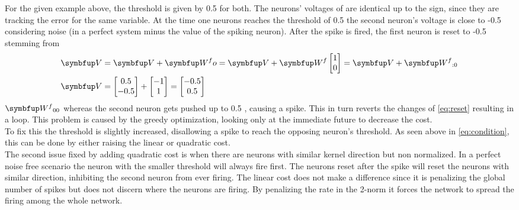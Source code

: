 For the given example above, the threshold is given by 0.5 for both. The neurons' voltages of are identical up to the sign, since they are tracking the error for the same variable. At the time one neurons reaches the threshold of 0.5 the second neuron's voltage is close to -0.5 considering noise (in a perfect system minus the value of the spiking neuron). After the spike is fired, the first neuron is reset to -0.5 stemming from
\begin{equation}\label{eq:reset}
\begin{aligned}
\bmu{V} &= \bmu{V} + \bmu{W^fo} = \bmu{V} + \bmu{W^f}\begin{bmatrix}
1\\
0
\end{bmatrix} = \bmu{V} + \bmu{W^f}_{:0}\\
\bmu{V} &= \begin{bmatrix}
0.5\\
-0.5\\
\end{bmatrix} +
\begin{bmatrix}
-1\\
1\\
\end{bmatrix} =
\begin{bmatrix}
-0.5\\
0.5
\end{bmatrix}
\end{aligned}
\end{equation}
$\bmu{W^f}_{00}$ whereas the second neuron gets pushed up to 0.5 , causing a spike. This in turn reverts the changes of \cref{eq:reset} resulting in a loop. This problem is caused by the greedy optimization, looking only at the immediate future to decrease the cost.\\
To fix this the threshold is slightly increased, disallowing a spike to reach the opposing neuron's threshold. As seen above in \cref{eq:condition}, this can be done by either raising the linear or quadratic cost.\\
The second issue fixed by adding quadratic cost is when there are
neurons with similar kernel direction but non normalized. In a perfect noise free scenario the neuron with the smaller threshold will always fire first. The neurons reset after the spike will reset the neurons with similar direction, inhibiting the second neuron from ever firing. The linear cost does not make a difference since it is penalizing the global number of spikes but does not discern where the neurons are firing. By penalizing the rate in the 2-norm it forces the network to spread the firing among the whole network.



